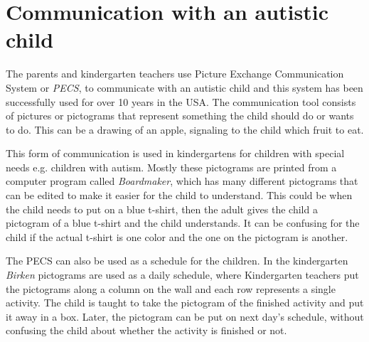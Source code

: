 \section{Communication with an autistic child}
The parents and kindergarten teachers use Picture Exchange Communication System or \emph{PECS}, to communicate with an autistic child and this system has been successfully used for over 10 years in the USA\cite{centerAutism}. The communication tool consists of pictures or pictograms that represent something the child should do or wants to do. This can be a drawing of an apple, signaling to the child which fruit to eat. 

This form of communication is used in kindergartens for children with special needs e.g. children with autism. Mostly these pictograms are printed from a computer program called \emph{Boardmaker}, which has many different pictograms that can be edited to make it easier for the child to understand\cite{centerAutism}. This could be when the child needs to put on a blue t-shirt, then the adult gives the child a pictogram of a blue t-shirt and the child understands. It can be confusing for the child if the actual t-shirt is one color and the one on the pictogram is another.

The PECS can also be used as a schedule for the children. In the kindergarten \emph{Birken} pictograms are used as a daily schedule, where Kindergarten teachers put the pictograms along a column on the wall and each row represents a single activity.
The child is taught to take the pictogram of the finished activity and put it away in a box. Later, the pictogram can be put on next day's schedule, without confusing the child about whether the activity is finished or not.

